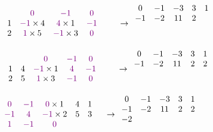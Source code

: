 \documentclass[11pt]{article}
\begin{document}
\[
\begin{array}{cccccccccc}
    &&&\textcolor{violet}{0}&\textcolor{violet}{-1}& \textcolor{violet}{0}&\\
    &&1&\textcolor{violet}{-1}\times 4&\textcolor{violet}{4}\times 1&\textcolor{violet}{-1}&&\\
    &&2&\textcolor{violet}{1}\times 5&\textcolor{violet}{-1}\times 3&\textcolor{violet}{0}& \\ 
\end{array}
\rightarrow
\begin{array}{ccccc}
    0 & -1 & -3 & 3&1\\
    -1 & -2 & 11 & 2&  \\
     &  &  & &  \\
     &  &  & &  \\
\end{array}
\]
\[
\begin{array}{cccccccccc}
    &&&&\textcolor{violet}{0}&\textcolor{violet}{-1}& \textcolor{violet}{0}&\\
    &&1&4&\textcolor{violet}{-1}\times 1&\textcolor{violet}{4}&\textcolor{violet}{-1}&&\\
    &&2&5&\textcolor{violet}{1}\times 3&\textcolor{violet}{-1}&\textcolor{violet}{0}& \\ 
\end{array}
\rightarrow
\begin{array}{ccccc}
    0 & -1 & -3 & 3&1\\
    -1 & -2 & 11 & 2&2\\
     &  &  & &  \\
     &  &  & &  \\
\end{array}
\]
\[
\begin{array}{cccccccccc}
    \textcolor{violet}{0}&\textcolor{violet}{-1}& \textcolor{violet}{0}\times 1&4&1&\\
    \textcolor{violet}{-1}&\textcolor{violet}{4}&\textcolor{violet}{-1}\times 2&5&3&\\
    \textcolor{violet}{1}&\textcolor{violet}{-1}&\textcolor{violet}{0}& \\ 
\end{array}
\rightarrow
\begin{array}{ccccc}
    0 & -1 & -3 & 3&1\\
    -1 & -2 & 11 & 2&2\\
    -2 &  &  & &  \\
     &  &  & &  \\
\end{array}
\]
\end{document}
